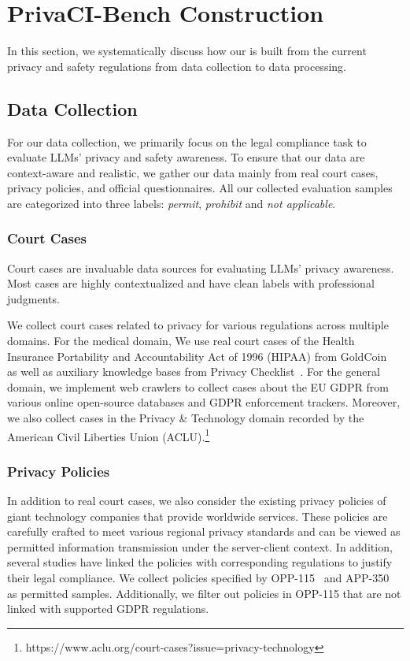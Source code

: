 


\section{PrivaCI-Bench Construction}
\label{sec: data}

In this section, we systematically discuss how our \name is built
from the current privacy and safety regulations from data collection to data processing.

\subsection{Data Collection}
For our data collection, we primarily focus on the legal compliance task to evaluate LLMs' privacy and safety awareness.
To ensure that our data are context-aware and realistic, we gather our data mainly from real court cases, privacy policies, and official questionnaires.
All our collected evaluation samples are categorized into three labels: \textit{permit}, \textit{prohibit} and \textit{not applicable}.

\subsubsection{Court Cases}

Court cases are invaluable data sources for evaluating LLMs' privacy awareness.
Most cases are highly contextualized and have clean labels with professional judgments.

We collect court cases related to privacy for various regulations across multiple domains.
For the medical domain, We use real court cases of the Health Insurance Portability and Accountability Act of 1996 (HIPAA) from GoldCoin~\cite{fan2024goldcoin} as well as auxiliary knowledge bases from Privacy Checklist~\cite{li-2024-privacychecklist}.
For the general domain, we implement web crawlers to collect cases about the EU GDPR from various online open-source databases and GDPR enforcement trackers.
Moreover, we also collect cases in the Privacy \& Technology domain recorded by the American Civil Liberties Union (ACLU).\footnote{https://www.aclu.org/court-cases?issue=privacy-technology}


\subsubsection{Privacy Policies}
In addition to real court cases, we also consider the existing privacy policies of giant technology companies that provide worldwide services.
These policies are carefully crafted to meet various regional privacy standards and can be viewed as permitted information transmission under the server-client context.
In addition, several studies have linked the policies with corresponding regulations to justify their legal compliance.
We collect policies specified by OPP-115~\cite{wilson-etal-2016-creation} and APP-350~\cite{Zimmeck2019MAPSSP} as permitted samples.
Additionally, we filter out policies in OPP-115 that are not linked with supported GDPR regulations.


